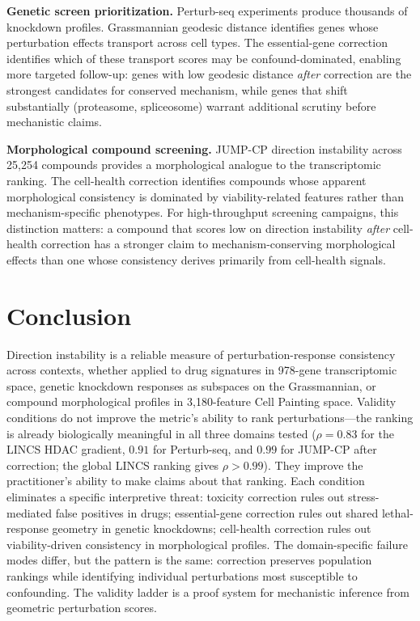 \documentclass{article}
\begin{document}
\textbf{Genetic screen prioritization.} Perturb-seq experiments produce
thousands of knockdown profiles. Grassmannian geodesic distance identifies
genes whose perturbation effects transport across cell types. The
essential-gene correction identifies which of these transport scores may be
confound-dominated, enabling more targeted follow-up: genes with low
geodesic distance \emph{after} correction are the strongest candidates for
conserved mechanism, while genes that shift substantially (proteasome,
spliceosome) warrant additional scrutiny before mechanistic claims.

\textbf{Morphological compound screening.} JUMP-CP direction instability
across 25{,}254 compounds provides a morphological analogue to the
transcriptomic ranking. The cell-health correction identifies compounds
whose apparent morphological consistency is dominated by viability-related
features rather than mechanism-specific phenotypes. For high-throughput
screening campaigns, this distinction matters: a compound that scores low
on direction instability \emph{after} cell-health correction has a stronger
claim to mechanism-conserving morphological effects than one whose
consistency derives primarily from cell-health signals.

\section{Conclusion}

Direction instability is a reliable measure of perturbation-response
consistency across contexts, whether applied to drug signatures in 978-gene
transcriptomic space, genetic knockdown responses as subspaces on the
Grassmannian, or compound morphological profiles in 3{,}180-feature Cell
Painting space. Validity conditions do not improve the metric's ability to
rank perturbations---the ranking is already biologically meaningful in all
three domains tested ($\rho = 0.83$ for the LINCS HDAC gradient, $0.91$
for Perturb-seq, and $0.99$ for JUMP-CP after correction; the global LINCS
ranking gives $\rho > 0.99$).
They improve the practitioner's ability to make claims about that ranking.
Each condition eliminates a specific interpretive threat: toxicity correction
rules out stress-mediated false positives in drugs; essential-gene correction
rules out shared lethal-response geometry in genetic knockdowns; cell-health
correction rules out viability-driven consistency in morphological profiles.
The domain-specific failure modes differ, but the pattern is the same:
correction preserves population rankings while identifying individual
perturbations most susceptible to confounding. The validity ladder is a
proof system for mechanistic inference from geometric perturbation scores.



\end{document}
